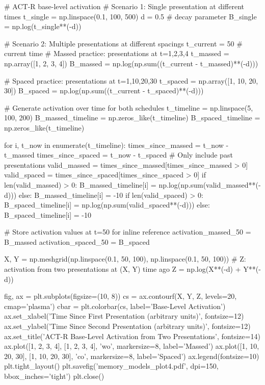 \documentclass[11pt,a4paper]{article}
\begin{document}
\begin{pycode}
# ACT-R base-level activation
# Scenario 1: Single presentation at different times
t_single = np.linspace(0.1, 100, 500)
d = 0.5  # decay parameter
B_single = np.log(t_single**(-d))

# Scenario 2: Multiple presentations at different spacings
t_current = 50  # current time
# Massed practice: presentations at t=1,2,3,4
t_massed = np.array([1, 2, 3, 4])
B_massed = np.log(np.sum((t_current - t_massed)**(-d)))

# Spaced practice: presentations at t=1,10,20,30
t_spaced = np.array([1, 10, 20, 30])
B_spaced = np.log(np.sum((t_current - t_spaced)**(-d)))

# Generate activation over time for both schedules
t_timeline = np.linspace(5, 100, 200)
B_massed_timeline = np.zeros_like(t_timeline)
B_spaced_timeline = np.zeros_like(t_timeline)

for i, t_now in enumerate(t_timeline):
    times_since_massed = t_now - t_massed
    times_since_spaced = t_now - t_spaced
    # Only include past presentations
    valid_massed = times_since_massed[times_since_massed > 0]
    valid_spaced = times_since_spaced[times_since_spaced > 0]
    if len(valid_massed) > 0:
        B_massed_timeline[i] = np.log(np.sum(valid_massed**(-d)))
    else:
        B_massed_timeline[i] = -10
    if len(valid_spaced) > 0:
        B_spaced_timeline[i] = np.log(np.sum(valid_spaced**(-d)))
    else:
        B_spaced_timeline[i] = -10

# Store activation values at t=50 for inline reference
activation_massed_50 = B_massed
activation_spaced_50 = B_spaced

X, Y = np.meshgrid(np.linspace(0.1, 50, 100), np.linspace(0.1, 50, 100))
# Z: activation from two presentations at (X, Y) time ago
Z = np.log(X**(-d) + Y**(-d))

fig, ax = plt.subplots(figsize=(10, 8))
cs = ax.contourf(X, Y, Z, levels=20, cmap='plasma')
cbar = plt.colorbar(cs, label='Base-Level Activation')
ax.set_xlabel('Time Since First Presentation (arbitrary units)', fontsize=12)
ax.set_ylabel('Time Since Second Presentation (arbitrary units)', fontsize=12)
ax.set_title('ACT-R Base-Level Activation from Two Presentations', fontsize=14)
ax.plot([1, 2, 3, 4], [1, 2, 3, 4], 'wo', markersize=8, label='Massed')
ax.plot([1, 10, 20, 30], [1, 10, 20, 30], 'co', markersize=8, label='Spaced')
ax.legend(fontsize=10)
plt.tight_layout()
plt.savefig('memory_models_plot4.pdf', dpi=150, bbox_inches='tight')
plt.close()
\end{pycode}
\end{document}

